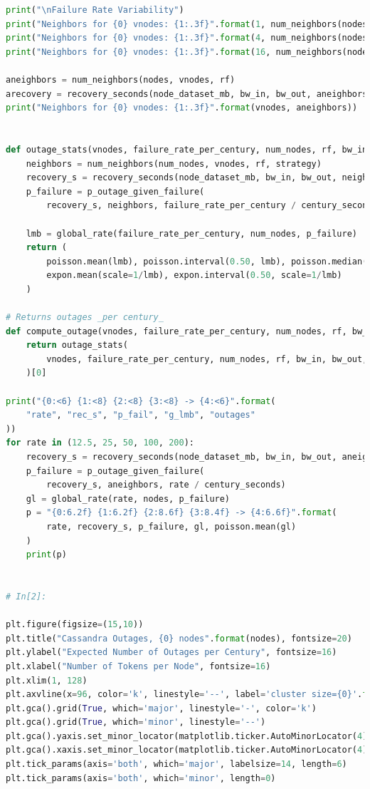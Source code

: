 \documentclass{article}
\begin{document}
\begin{lstlisting}[language=Python]
print("\nFailure Rate Variability")
print("Neighbors for {0} vnodes: {1:.3f}".format(1, num_neighbors(nodes, 1, rf)))
print("Neighbors for {0} vnodes: {1:.3f}".format(4, num_neighbors(nodes, 4, rf)))
print("Neighbors for {0} vnodes: {1:.3f}".format(16, num_neighbors(nodes, 16, rf)))

aneighbors = num_neighbors(nodes, vnodes, rf)
arecovery = recovery_seconds(node_dataset_mb, bw_in, bw_out, aneighbors)
print("Neighbors for {0} vnodes: {1:.3f}".format(vnodes, aneighbors))


def outage_stats(vnodes, failure_rate_per_century, num_nodes, rf, bw_in, bw_out, strategy='rack'):
    neighbors = num_neighbors(num_nodes, vnodes, rf, strategy)
    recovery_s = recovery_seconds(node_dataset_mb, bw_in, bw_out, neighbors)
    p_failure = p_outage_given_failure(
        recovery_s, neighbors, failure_rate_per_century / century_seconds)

    lmb = global_rate(failure_rate_per_century, num_nodes, p_failure)
    return (
        poisson.mean(lmb), poisson.interval(0.50, lmb), poisson.median(lmb),
        expon.mean(scale=1/lmb), expon.interval(0.50, scale=1/lmb)
    )

# Returns outages _per century_
def compute_outage(vnodes, failure_rate_per_century, num_nodes, rf, bw_in, bw_out, strategy='rack'):
    return outage_stats(
        vnodes, failure_rate_per_century, num_nodes, rf, bw_in, bw_out, strategy
    )[0]

print("{0:<6} {1:<8} {2:<8} {3:<8} -> {4:<6}".format(
    "rate", "rec_s", "p_fail", "g_lmb", "outages"
))
for rate in (12.5, 25, 50, 100, 200):
    recovery_s = recovery_seconds(node_dataset_mb, bw_in, bw_out, aneighbors)
    p_failure = p_outage_given_failure(
        recovery_s, aneighbors, rate / century_seconds)
    gl = global_rate(rate, nodes, p_failure)
    p = "{0:6.2f} {1:6.2f} {2:8.6f} {3:8.4f} -> {4:6.6f}".format(
        rate, recovery_s, p_failure, gl, poisson.mean(gl)
    )
    print(p)


# In[2]:

plt.figure(figsize=(15,10))
plt.title("Cassandra Outages, {0} nodes".format(nodes), fontsize=20)
plt.ylabel("Expected Number of Outages per Century", fontsize=16)
plt.xlabel("Number of Tokens per Node", fontsize=16)
plt.xlim(1, 128)
plt.axvline(x=96, color='k', linestyle='--', label='cluster size={0}'.format(nodes))
plt.gca().grid(True, which='major', linestyle='-', color='k')
plt.gca().grid(True, which='minor', linestyle='--')
plt.gca().yaxis.set_minor_locator(matplotlib.ticker.AutoMinorLocator(4))
plt.gca().xaxis.set_minor_locator(matplotlib.ticker.AutoMinorLocator(4))
plt.tick_params(axis='both', which='major', labelsize=14, length=6)
plt.tick_params(axis='both', which='minor', length=0)


\end{lstlisting}
\end{document}
